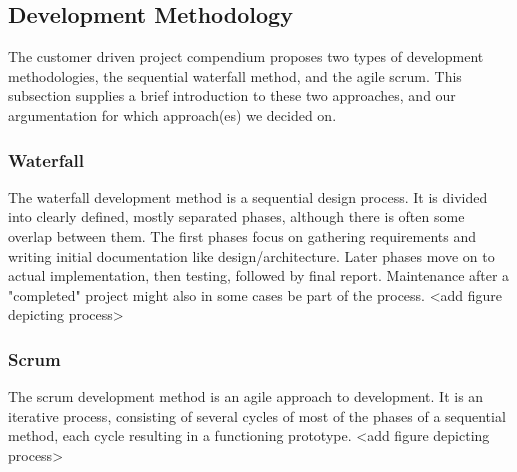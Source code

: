 \subsection{Development Methodology}
The customer driven project compendium proposes two types of development methodologies, the sequential waterfall method, and the agile scrum. This subsection supplies a brief introduction to these two approaches, and our argumentation for which approach(es) we decided on.
\subsubsection{Waterfall}
The waterfall development method is a sequential design process. It is divided into clearly defined, mostly separated phases, although there is often some overlap between them. The first phases focus on gathering requirements and writing initial documentation like design/architecture. Later phases move on to actual implementation, then testing, followed by final report. Maintenance after a "completed" project might also in some cases be part of the process. <add figure depicting process>
\subsubsection{Scrum}
The scrum development method is an agile approach to development. It is an iterative process, consisting of several cycles of most of the phases of a sequential method, each cycle resulting in a functioning prototype. <add figure depicting process>
